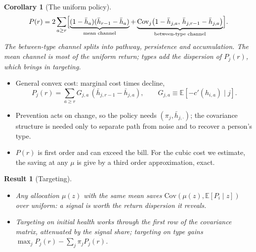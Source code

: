 \documentclass[11pt]{article}
\newtheorem{result}{Result}
\newtheorem{corollary}{Corollary}
\newcommand{\E}{\mathbb{E}}
\newcommand{\Cov}{\mathrm{Cov}}
\begin{document}
\begin{corollary}[The uniform policy]\label{cor:uniform}
	\begin{equation}
		P(r)=2\sum_{a\ge r}\Bigl[\underbrace{(1-\bar h_a)(\bar h_{r-1}-\bar h_a)}_{\text{mean channel}}
		+\underbrace{\Cov_j\bigl(1-\bar h_{j,a},\,\bar h_{j,r-1}-\bar h_{j,a}\bigr)}_{\text{between-type channel}}\Bigr].
		\label{eq:P}
	\end{equation}
	The between-type channel splits into pathway, persistence and accumulation. The mean channel is most of the uniform return; types add the dispersion of $P_j(r)$, which brings in targeting.
\end{corollary}

\begin{itemize}
	\item General convex cost: marginal cost times decline,
	\begin{equation}
		P_j(r)=\sum_{a\ge r}G_{j,a}\,(\bar h_{j,r-1}-\bar h_{j,a}),\qquad G_{j,a}\equiv\E[-c'(h_{i,a})\mid j].
		\label{eq:Pj_general}
	\end{equation}
	\item Prevention acts on change, so the policy needs $(\pi_j,\bar h_{j,\cdot})$; the covariance structure is needed only to separate path from noise and to recover a person's type.
	\item $P(r)$ is first order and can exceed the bill. For the cubic cost we estimate, the saving at any $\mu$ is give by a third order approximation, exact.
\end{itemize}

\begin{result}[Targeting]\label{res:target}~
	\begin{itemize}
		\item Any allocation $\mu(z)$ with the same mean saves $\Cov(\mu(z),\E[P_i\mid z])$ over uniform: a signal is worth the return dispersion it reveals.
		\item Targeting on initial health works through the first row of the covariance matrix, attenuated by the signal share; targeting on type gains $\max_jP_j(r)-\sum_j\pi_jP_j(r)$.
	\end{itemize}
\end{result}
\end{document}
